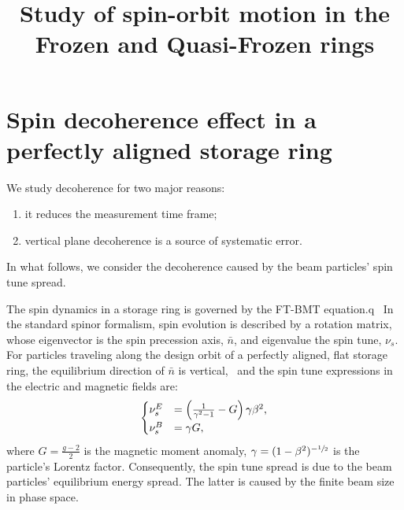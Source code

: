 \documentclass{article}
\newcommand{\st}{\nu_s}
\newcommand{\nbar}{\bar n}
\begin{document}
\title{Study of spin-orbit motion in the Frozen and Quasi-Frozen rings}
\maketitle

\section{Spin decoherence effect in a perfectly aligned storage ring}

We study decoherence for two major reasons:
\begin{enumerate}
\item it reduces the measurement time frame;
\item vertical plane decoherence is a source of systematic error.~\cite[p. 8]{Senichev:StorageRingMethod}
\end{enumerate}

In what follows, we consider the decoherence caused by the beam particles' spin tune spread.

The spin dynamics in a storage ring is governed by the FT-BMT equation.q~\cite[p. 4]{JEDI:SpinTuneMapping} In the standard spinor formalism, spin evolution is described by a rotation matrix, whose eigenvector is the spin precession axis, $\nbar$, and eigenvalue the spin tune, $\st$. For particles traveling along the design orbit of a perfectly aligned, flat storage ring, the equilibrium direction of $\nbar$ is vertical,~\cite[p. 1362]{DESY:SpinTune} and the spin tune expressions in the electric and magnetic fields are:~\cite[p. 8]{Senichev:StorageRingMethod}
\begin{equation}
  \begin{cases}
    \st^E &= \bkt{\frac1{\gamma^2-1}-G}\gamma\beta^2, \\
    \st^B &= \gamma G,
  \end{cases}
\end{equation}
where $G = \frac{g-2}{2}$ is the magnetic moment anomaly, $\gamma = (1-\beta^2)^{-\sfrac12}$ is the particle's Lorentz factor. Consequently, the spin tune spread is due to the beam particles' equilibrium energy spread. The latter is caused by the finite beam size in phase space.
\end{document}
